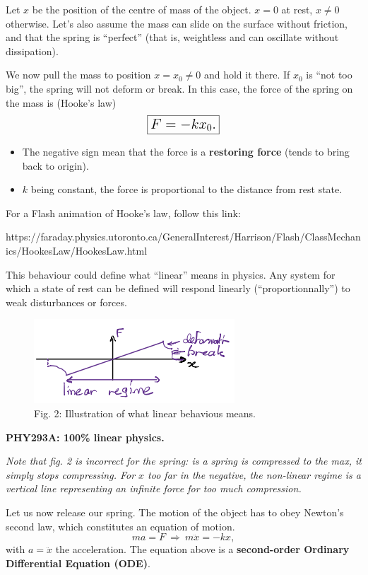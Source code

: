 \documentclass[11pt]{article}
\makeatletter
\def\maxwidth{\ifdim\Gin@nat@width>\linewidth\linewidth
    \else\Gin@nat@width\fi}
\let\Oldincludegraphics\includegraphics
\renewcommand{\includegraphics}[1]{\Oldincludegraphics[width=.8\maxwidth]{#1}}
\makeatother
\begin{document}
Let \(x\) be the position of the centre of mass of the object. \(x=0\)
at rest, \(x\neq 0\) otherwise. Let's also assume the mass can slide on
the surface without friction, and that the spring is ``perfect'' (that
is, weightless and can oscillate without dissipation).

    We now pull the mass to position \(x = x_0 \neq 0\) and hold it there.
If \(x_0\) is ``not too big'', the spring will not deform or break. In
this case, the force of the spring on the mass is (Hooke's law)
\[ \Large \boxed{F = -kx_0.} \]

\begin{itemize}
\item
  The negative sign mean that the force is a \textbf{restoring force}
  (tends to bring back to origin).
\item
  \(k\) being constant, the force is proportional to the distance from
  rest state.
\end{itemize}

    For a Flash animation of Hooke's law, follow this link:

https://faraday.physics.utoronto.ca/GeneralInterest/Harrison/Flash/ClassMechanics/HookesLaw/HookesLaw.html

    This behaviour could define what ``linear'' means in physics. Any system
for which a state of rest can be defined will respond linearly
(``proportionnally'') to weak disturbances or forces.

\begin{figure}
\centering
\includegraphics{Linear.png}
\caption{Fig. 2: Illustration of what linear behavious means.}
\end{figure}

\textbf{PHY293A: 100\% linear physics.}

\emph{Note that fig. 2 is incorrect for the spring: is a spring is
compressed to the max, it simply stops compressing. For \(x\) too far in
the negative, the non-linear regime is a vertical line representing an
infinite force for too much compression.}

    Let us now release our spring. The motion of the object has to obey
Newton's second law, which constitutes an equation of motion.
\[ ma = F\ \Rightarrow\ m\ddot{x} = -kx, \] with \(a = \ddot{x}\) the
acceleration. The equation above is a \textbf{second-order Ordinary
Differential Equation (ODE)}.
\end{document}
